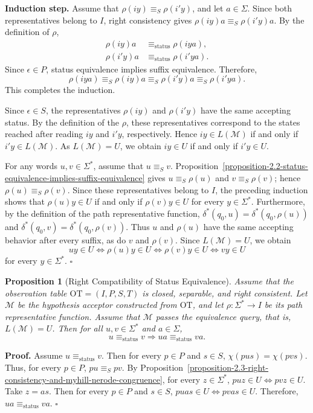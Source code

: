 \documentclass{ieice-tecrep}
\newtheorem{proposition}{Proposition}
\begin{document}
\noindent\textbf{Induction step.} Assume that
\(\rho(iy)\equiv_S\rho(i'y)\), and let \(a\in\Sigma\).
Since both representatives belong to \(I\), right consistency gives
\(\rho(iy)a\equiv_S\rho(i'y)a\).
By the definition of \(\rho\),
\[
\begin{aligned}
\rho(iy)a&\equiv_{\mathrm{status}}\rho(iya),\\
\rho(i'y)a&\equiv_{\mathrm{status}}\rho(i'ya).
\end{aligned}
\]
Since \(\epsilon\in P\), status equivalence implies suffix
equivalence. Therefore,
\[
\rho(iya)\equiv_S\rho(iy)a
\equiv_S\rho(i'y)a\equiv_S\rho(i'ya).
\]
This completes the induction.

Since \(\epsilon\in S\), the representatives \(\rho(iy)\) and
\(\rho(i'y)\) have the same accepting status. By the definition of
the \(\rho\), these representatives correspond
to the states reached after reading \(iy\) and \(i'y\), respectively.
Hence \(iy\in L(\mathcal M)\) if and only if
\(i'y\in L(\mathcal M)\). As \(L(\mathcal M)=U\), we obtain
\(iy\in U\) if and only if \(i'y\in U\).

For any words \(u,v\in\Sigma^*\), assume that \(u\equiv_S v\).
Proposition~\ref{proposition-2.2-status-equivalence-implies-suffix-equivalence}
gives \(u\equiv_S\rho(u)\) and \(v\equiv_S\rho(v)\); hence
\(\rho(u)\equiv_S\rho(v)\). Since these representatives belong to
\(I\), the preceding induction shows that
\(\rho(u)y\in U\) if and only if \(\rho(v)y\in U\) for every
\(y\in\Sigma^*\). Furthermore, by the definition of the path
representative function,
\(\delta^*(q_0,u)=\delta^*(q_0,\rho(u))\) and
\(\delta^*(q_0,v)=\delta^*(q_0,\rho(v))\). Thus \(u\) and
\(\rho(u)\) have the same accepting behavior after every suffix,
as do \(v\) and \(\rho(v)\). Since \(L(\mathcal M)=U\), we obtain
\[
uy\in U \Longleftrightarrow \rho(u)y\in U \Longleftrightarrow \rho(v)y\in U \Longleftrightarrow vy\in U
\]
for every \(y\in\Sigma^*\). 
\hfill $\square$

\begin{proposition}[Right Compatibility of Status Equivalence]\label{proposition-2.4-stable-right-transition-of-status-equivalence-i-dont-have-any-idea-about-the-name-of-this-title}
Assume that the observation table
\(\mathrm{OT}=(I,P,S,T)\) is closed, separable, and right consistent.
Let \(\mathcal{M}\) be the hypothesis acceptor constructed from \(\mathrm{OT}\),
and let \(\rho:\Sigma^*\to I\) be its path representative function.
Assume that \(\mathcal{M}\) passes the equivalence query, that is, \(L(\mathcal{M})=U\). Then for all \(u,v\in\Sigma^*\) and \(a\in\Sigma\),
\[
u\equiv_{\mathrm{status}}v
\Longrightarrow
ua\equiv_{\mathrm{status}}va.
\]
\end{proposition}
\noindent\textbf{Proof.} Assume \(u\equiv_{\mathrm{status}}v\). Then for every
\(p\in P\) and \(s\in S\), \(\chi(pus)=\chi(pvs)\). Thus, for every \(p\in P\), \(pu\equiv_S pv\). By Proposition~\ref{proposition-2.3-right-consistency-and-myhill-nerode-congruence}, for every \(z\in\Sigma^*\), \(puz\in U\Longleftrightarrow pvz\in U\). Take \(z=as\). Then for every \(p\in P\) and \(s\in S\), \(puas\in U\Longleftrightarrow pvas\in U\). Therefore, \(ua\equiv_{\mathrm{status}}va\).
\hfill $\square$
\end{document}
